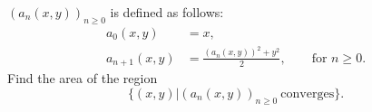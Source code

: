 $(a_n(x,y))_{n\geq 0}$ is defined as follows:
\begin{align*}
a_0(x, y) &= x, \\
a_{n+1}(x, y) &= \frac{(a_n(x, y))^2 + y^2}{2}, \qquad \mbox{for $n \geq 0$}.
\end{align*}
Find the area of the region
\[
\{ (x, y) | (a_n(x, y))_{n \geq 0}\ \mbox{converges}\}.
\]
